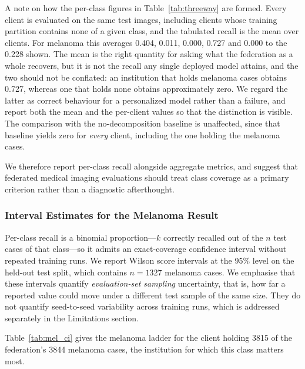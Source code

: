 \documentclass[utf8]{FrontiersinHarvard} %
\begin{document}
A note on how the per-class figures in Table~\ref{tab:threeway} are formed. Every client is evaluated on the same test images, including clients whose training partition contains none of a given class, and the tabulated recall is the mean over clients. For melanoma this averages 0.404, 0.011, 0.000, 0.727 and 0.000 to the 0.228 shown. The mean is the right quantity for asking what the federation as a whole recovers, but it is not the recall any single deployed model attains, and the two should not be conflated: an institution that holds melanoma cases obtains 0.727, whereas one that holds none obtains approximately zero. We regard the latter as correct behaviour for a personalized model rather than a failure, and report both the mean and the per-client values so that the distinction is visible. The comparison with the no-decomposition baseline is unaffected, since that baseline yields zero for \emph{every} client, including the one holding the melanoma cases.

We therefore report per-class recall alongside aggregate metrics, and suggest that federated medical imaging evaluations should treat class coverage as a primary criterion rather than a diagnostic afterthought.

\subsubsection{Interval Estimates for the Melanoma Result}
\label{sec:intervals}

Per-class recall is a binomial proportion---$k$ correctly recalled out of the $n$ test cases of that class---so it admits an exact-coverage confidence interval without repeated training runs. We report Wilson score intervals at the 95\% level on the held-out test split, which contains $n = 1327$ melanoma cases. We emphasise that these intervals quantify \emph{evaluation-set sampling} uncertainty, that is, how far a reported value could move under a different test sample of the same size. They do not quantify seed-to-seed variability across training runs, which is addressed separately in the Limitations section.

Table~\ref{tab:mel_ci} gives the melanoma ladder for the client holding 3815 of the federation's 3844 melanoma cases, the institution for which this class matters most.
\end{document}

